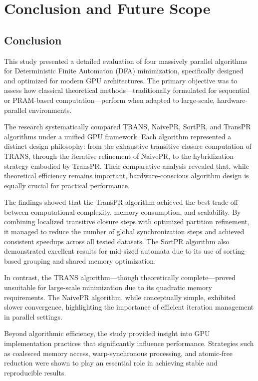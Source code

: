 \chapter{Conclusion and Future Scope}\label{chap:conclusion}

\section{Conclusion}

This study presented a detailed evaluation of four massively parallel algorithms for Deterministic Finite Automaton (DFA) minimization, specifically designed and optimized for modern GPU architectures. The primary objective was to assess how classical theoretical methods—traditionally formulated for sequential or PRAM-based computation—perform when adapted to large-scale, hardware-parallel environments.

The research systematically compared TRANS, NaivePR, SortPR, and TransPR algorithms under a unified GPU framework. Each algorithm represented a distinct design philosophy: from the exhaustive transitive closure computation of TRANS, through the iterative refinement of NaivePR, to the hybridization strategy embodied by TransPR. Their comparative analysis revealed that, while theoretical efficiency remains important, hardware-conscious algorithm design is equally crucial for practical performance.

The findings showed that the TransPR algorithm achieved the best trade-off between computational complexity, memory consumption, and scalability. By combining localized transitive closure steps with optimized partition refinement, it managed to reduce the number of global synchronization steps and achieved consistent speedups across all tested datasets. The SortPR algorithm also demonstrated excellent results for mid-sized automata due to its use of sorting-based grouping and shared memory optimization.

In contrast, the TRANS algorithm—though theoretically complete—proved unsuitable for large-scale minimization due to its quadratic memory requirements. The NaivePR algorithm, while conceptually simple, exhibited slower convergence, highlighting the importance of efficient iteration management in parallel settings.

Beyond algorithmic efficiency, the study provided insight into GPU implementation practices that significantly influence performance. Strategies such as coalesced memory access, warp-synchronous processing, and atomic-free reduction were shown to play an essential role in achieving stable and reproducible results.

